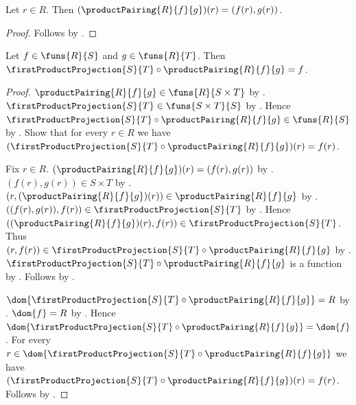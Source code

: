 \begin{proposition}\label{product_pairing_apply}
    Let $r\in R$.
    Then $(\productPairing{R}{f}{g})(r)=(f(r),g(r))$.
\end{proposition}
\begin{proof}
    Follows by
        .
\end{proof}

\begin{theorem}\label{first_projection_of_product_pairing}
    Let $f\in\funs{R}{S}$ and $g\in\funs{R}{T}$.
    Then $\firstProductProjection{S}{T}\circ
        \productPairing{R}{f}{g}=f$.
\end{theorem}
\begin{proof}
    $\productPairing{R}{f}{g}\in\funs{R}{S\times T}$ by
        .
    $\firstProductProjection{S}{T}\in\funs{S\times T}{S}$ by
        .
    Hence $\firstProductProjection{S}{T}\circ
        \productPairing{R}{f}{g}\in\funs{R}{S}$ by
        .
    Show that for every $r\in R$ we have
        $(\firstProductProjection{S}{T}\circ
            \productPairing{R}{f}{g})(r)=f(r)$.
    \begin{subproof}
        Fix $r\in R$.
        $(\productPairing{R}{f}{g})(r)=(f(r),g(r))$ by
            .
        $(f(r),g(r))\in S\times T$ by
            .
        $(r,(\productPairing{R}{f}{g})(r))
            \in\productPairing{R}{f}{g}$ by
            .
        $((f(r),g(r)),f(r))\in
            \firstProductProjection{S}{T}$ by
            .
        Hence $((\productPairing{R}{f}{g})(r),f(r))\in
            \firstProductProjection{S}{T}$.
        Thus $(r,f(r))\in\firstProductProjection{S}{T}\circ
            \productPairing{R}{f}{g}$ by .
        $\firstProductProjection{S}{T}\circ
            \productPairing{R}{f}{g}$ is a function by
            .
        Follows by .
    \end{subproof}
    $\dom{\firstProductProjection{S}{T}\circ
        \productPairing{R}{f}{g}}=R$ by .
    $\dom{f}=R$ by .
    Hence $\dom{\firstProductProjection{S}{T}\circ
        \productPairing{R}{f}{g}}=\dom{f}$.
    For every $r\in\dom{\firstProductProjection{S}{T}\circ
        \productPairing{R}{f}{g}}$ we have
        $(\firstProductProjection{S}{T}\circ
            \productPairing{R}{f}{g})(r)=f(r)$.
    Follows by .
\end{proof}


